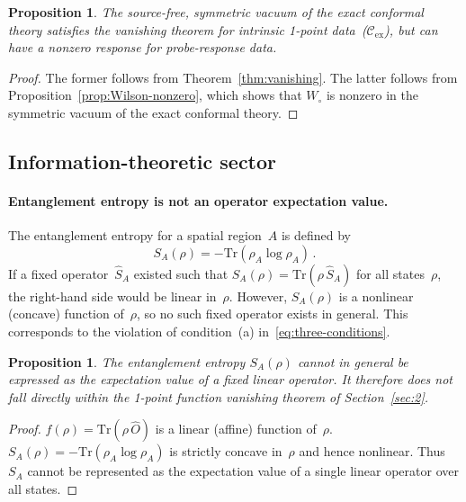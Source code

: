 \documentclass[
  aps,
  prd,
  preprint,
  groupedaddress,
  nofootinbib,
  longbibliography
]{revtex4-2}
\newtheorem{proposition}[definition]{Proposition}
\theoremstyle{remark}
\newcommand{\Cex}{\mathcal{C}_{\mathrm{ex}}}
\begin{document}
\begin{proposition}\label{prop:intrinsic-vs-probe}
The source-free, symmetric vacuum of the exact conformal theory
satisfies the vanishing theorem for intrinsic 1-point
data~($\Cex$), but can have a nonzero response for
probe-response data.
\end{proposition}

\begin{proof}
The former follows from Theorem~\ref{thm:vanishing}.
The latter follows from
Proposition~\ref{prop:Wilson-nonzero}, which shows that
$W_\circ$ is nonzero in the symmetric vacuum of the exact
conformal theory.
\end{proof}

\subsection{Information-theoretic sector}\label{subsec:6-3}

\paragraph{Entanglement entropy is not an operator expectation
  value.}
The entanglement entropy for a spatial region~$A$ is defined by
\begin{equation}\label{eq:EE-def}
  S_A(\rho) = -\mathrm{Tr}(\rho_A\log\rho_A)\,.
\end{equation}
If a fixed operator~$\hat{S}_A$ existed such that
$S_A(\rho)=\mathrm{Tr}(\rho\,\hat{S}_A)$ for all states~$\rho$,
the right-hand side would be linear in~$\rho$.
However, $S_A(\rho)$ is a nonlinear (concave) function
of~$\rho$, so no such fixed operator exists in general.
This corresponds to the violation of condition~(a)
in~\eqref{eq:three-conditions}.

\begin{proposition}\label{prop:EE-not-linear}
The entanglement entropy $S_A(\rho)$ cannot in general be
expressed as the expectation value of a fixed linear operator.
It therefore does not fall directly within the 1-point function
vanishing theorem of Section~\ref{sec:2}.
\end{proposition}

\begin{proof}
$f(\rho)=\mathrm{Tr}(\rho\,\hat{O})$ is a linear (affine)
function of~$\rho$.
$S_A(\rho)=-\mathrm{Tr}(\rho_A\log\rho_A)$ is strictly concave
in~$\rho$ and hence nonlinear.
Thus $S_A$ cannot be represented as the expectation value of a
single linear operator over all states.
\end{proof}
\end{document}
